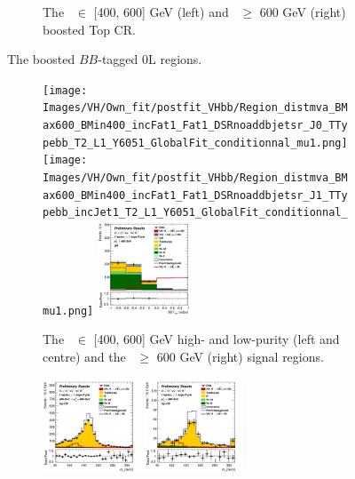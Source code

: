 \begin{figure}[h!]
\begin{subfigure}[b]{\textwidth}
        \caption{The \ptv\ $\in$ [400, 600] GeV (left) and \ptv\ $\geq$ 600 GeV (right) boosted Top CR.}
        \label{fig:plots_VHbbBoost_OL_topCR}
    \end{subfigure}
    \caption{The boosted $BB$-tagged 0L regions.}
    \label{fig:plots_VHbbBoost_OL}
\end{figure} 



\begin{figure}[h!]
    \centering
    \begin{subfigure}[b]{\textwidth}
        \centering
        \texttt{[image: Images/VH/Own\_fit/postfit\_VHbb/Region\_distmva\_BMax600\_BMin400\_incFat1\_Fat1\_DSRnoaddbjetsr\_J0\_TTypebb\_T2\_L1\_Y6051\_GlobalFit\_conditionnal\_mu1.png]}
        \texttt{[image: Images/VH/Own\_fit/postfit\_VHbb/Region\_distmva\_BMax600\_BMin400\_incFat1\_Fat1\_DSRnoaddbjetsr\_J1\_TTypebb\_incJet1\_T2\_L1\_Y6051\_GlobalFit\_conditionnal\_mu1.png]}
        \includegraphics[width=0.32\textwidth]{Images/VH/Own_fit/postfit_VHbb/Region_distmva_BMin600_incFat1_Fat1_DSRnoaddbjetsr_J0_TTypebb_incJet1_T2_L1_Y6051_GlobalFit_conditionnal_mu1.png}
        \caption{The \ptv\ $\in$ [400, 600] GeV high- and low-purity (left and centre) and the \ptv\ $\geq$ 600 GeV (right) signal regions.}
        \label{fig:plots_VHbbBoost_1L_SR}
    \end{subfigure}
    \begin{subfigure}[b]{\textwidth}
        \centering
        \includegraphics[width=0.32\textwidth]{Images/VH/Own_fit/postfit_VHbb/Region_distmBB_BMax600_BMin400_incFat1_Fat1_DSRtopaddbjetcr_J0_TTypebb_incJet1_T2_L1_Y6051_GlobalFit_conditionnal_mu1.png}
        \includegraphics[width=0.32\textwidth]{Images/VH/Own_fit/postfit_VHbb/Region_distmBB_BMin600_incFat1_Fat1_DSRtopaddbjetcr_J0_TTypebb_incJet1_T2_L1_Y6051_GlobalFit_conditionnal_mu1.png}

\end{subfigure}
\end{figure}
